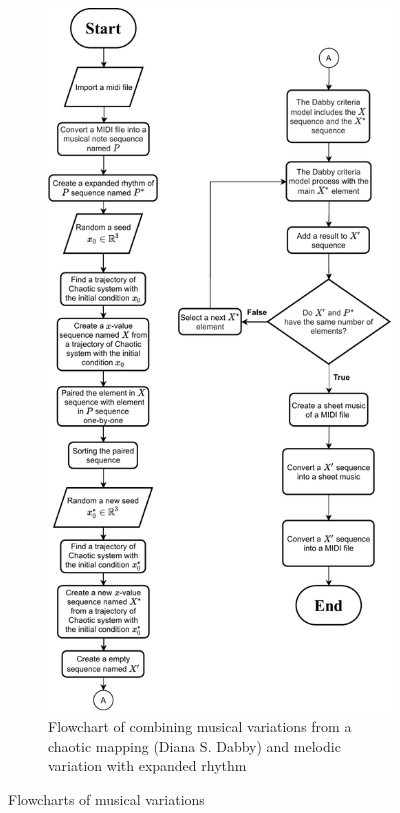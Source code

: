\documentclass[11pt]{article}
\begin{document}
\begin{figure}
\begin{subfigure}{0.45\textwidth}
\end{subfigure}
\begin{subfigure}{0.45\textwidth}
  \centering
  \includegraphics[scale=0.55]{Real_process.pdf}
  \caption{Flowchart of combining musical variations from a chaotic mapping (Diana S. Dabby) and melodic variation with expanded rhythm}
\end{subfigure}
\caption{Flowcharts of musical variations}
\label{fig:combined_flowcharts}
\end{figure}

\pagebreak

\printbibliography
\end{document}
